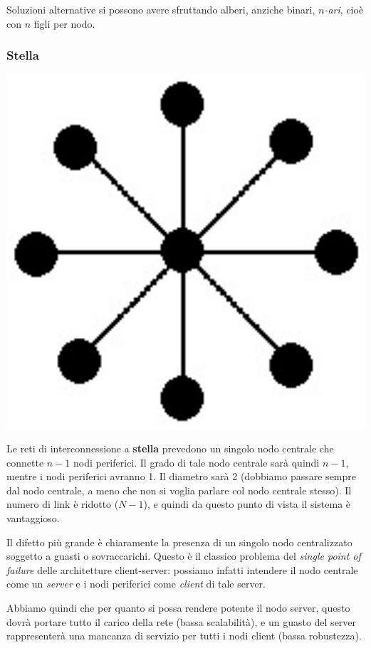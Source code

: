 \documentclass[a4paper,11pt]{article}
\begin{document}
Soluzioni alternative si possono avere sfruttando alberi, anziche binari, \textit{$n$-ari}, cioè con $n$ figli per nodo.

\subsubsection{Stella}
\begin{center}
	\includegraphics[scale=0.11]{../figures/star.png}
\end{center}
Le reti di interconnessione a \textbf{stella} prevedono un singolo nodo centrale che connette $n-1$ nodi periferici.
Il grado di tale nodo centrale sarà quindi $n - 1$, mentre i nodi periferici avranno 1.
Il diametro sarà 2 (dobbiamo passare sempre dal nodo centrale, a meno che non si voglia parlare col nodo centrale stesso).
Il numero di link è ridotto ($N - 1$), e quindi da questo punto di vista il sistema è vantaggioso.

Il difetto più grande è chiaramente la presenza di un singolo nodo centralizzato soggetto a guasti o sovraccarichi.
Questo è il classico problema del \textit{single point of failure} delle architetture client-server: possiamo infatti intendere il nodo centrale come un \textit{server} e i nodi periferici come \textit{client} di tale server.

Abbiamo quindi che per quanto si possa rendere potente il nodo server, questo dovrà portare tutto il carico della rete (bassa scalabilità), e un guasto del server rappresenterà una mancanza di servizio per tutti i nodi client (bassa robustezza).
\end{document}
